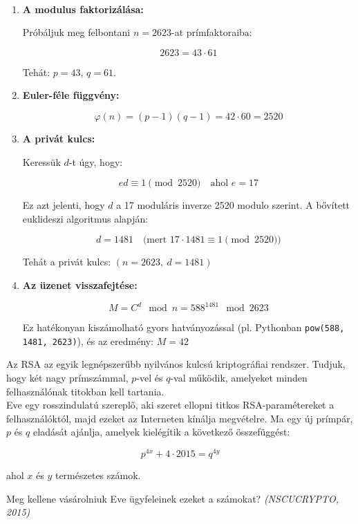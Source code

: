 \begin{solution}
~
\begin{enumerate}
\item \textbf{A modulus faktorizálása:}

Próbáljuk meg felbontani $n=2623$-at prímfaktoraiba:

\[
2623=43\cdot61
\]

Tehát: $p=43$, $q=61$.
\item \textbf{Euler-féle függvény:}

\[
\varphi(n)=(p-1)(q-1)=42\cdot60=2520
\]

\item \textbf{A privát kulcs:}

Keressük $d$-t úgy, hogy:

\[
ed\equiv1\pmod{2520}\quad\text{ahol }e=17
\]

Ez azt jelenti, hogy $d$ a 17 moduláris inverze 2520 modulo szerint.
A bővített euklideszi algoritmus alapján:

\[
d=1481\quad\text{(mert }17\cdot1481\equiv1\pmod{2520})
\]

Tehát a privát kulcs: $(n=2623,\ d=1481)$
\item \textbf{Az üzenet visszafejtése:}

\[
M=C^{d}\mod n=588^{1481}\mod 2623
\]

Ez hatékonyan kiszámolható gyors hatványozással (pl. Pythonban \texttt{pow(588,
1481, 2623)}), és az eredmény: $M=42$ 

\end{enumerate}
\end{solution}
\begin{extraproblem}
Az RSA az egyik legnépszerűbb nyilvános kulcsú kriptográfiai rendszer.
Tudjuk, hogy két nagy prímszámmal, $p$-vel és $q$-val működik, amelyeket
minden felhasználónak titokban kell tartania. \\
 Eve egy rosszindulatú szereplő, aki szeret ellopni titkos RSA-paramétereket
a felhasználóktól, majd ezeket az Interneten kínálja megvételre. Ma
egy új prímpár, $p$ és $q$ eladását ajánlja, amelyek kielégítik
a következő összefüggést:

\[
p^{4x}+4\cdot2015=q^{4y}
\]

ahol $x$ és $y$ természetes számok.

\bigskip{}

Meg kellene vásárolniuk Eve ügyfeleinek ezeket a számokat?\emph{ (NSCUCRYPTO,
2015) }
\end{extraproblem}

